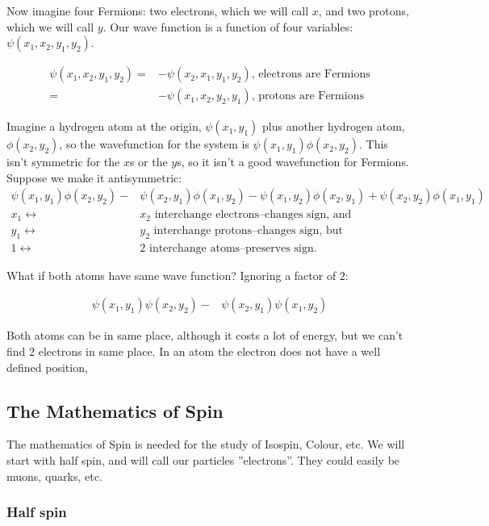 \documentclass[]{article}
\begin{document}
Now imagine four Fermions: two electrons, which we will call $x$, and two protons, which we will call $y$. Our wave function is a function of four variables: $\psi(x_1,x_2,y_1,y_2)$.

\begin{align*}
	\psi(x_1,x_2,y_1,y_2) = &-\psi(x_2,x_1,y_1,y_2) \text{, electrons are Fermions}\\
	=& - \psi(x_1,x_2,y_2,y_1) \text{, protons are Fermions}
\end{align*} 

Imagine a hydrogen atom at the origin, $\psi(x_1,y_1)$ plus another hydrogen atom, $\phi(x_2,y_2)$, so the wavefunction for the system is $\psi(x_1,y_1)\phi(x_2,y_2)$. This isn't symmetric for the $x$s or the $y$s, so it isn't a good wavefunction for Fermions. Suppose we make it antisymmetric:
\begin{align*}
	\psi(x_1,y_1) \phi(x_2,y_2) -& \psi(x_2,y_1) \phi(x_1,y_2) 
	-\psi(x_1,y_2) \phi(x_2,y_1) + \psi(x_2,y_2) \phi(x_1,y_1)\\
	x_1 \leftrightarrow& x_2 \text{ interchange electrons--changes sign, and}\\
	y_1 \leftrightarrow& y_2 \text{ interchange protons--changes sign, but}\\
	1 \leftrightarrow& 2 \text { interchange atoms--preserves sign.}
\end{align*}

What if both atoms have same wave function? Ignoring a factor of $2$:

\begin{align*}
	\psi(x_1,y_1) \psi(x_2,y_2) -& \psi(x_2,y_1) \psi(x_1,y_2) 
\end{align*}

Both atoms can be in same place, although it costs a lot of energy, but we can't find 2 electrons in same place. In an atom the electron does not have a well defined position, 

\subsection{The Mathematics of Spin}

The mathematics of Spin is needed for the study of Isospin, Colour, etc. We will start with half spin, and will call our particles ''electrons''. They could easily be muons, quarks, etc. 

\subsubsection{Half spin}
\end{document}
